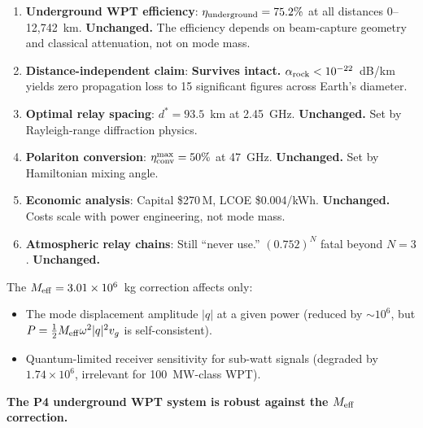 \documentclass[11pt]{article}
\newcommand{\ee}[1]{\times 10^{#1}}
\newcommand{\Meff}{M_{\rm eff}}
\newcommand{\alpharock}{\alpha_{\rm rock}}
\begin{document}
\begin{tcolorbox}[colback=green!5!white, colframe=green!60!black,
  title=\textbf{W3i5 P4 Verdict: All Core Claims Survive the $\Meff$ Correction}]
\begin{enumerate}[nosep]
\item \textbf{Underground WPT efficiency}: $\eta_{\rm underground} = 75.2\%$ at
  all distances 0--12,742~km. \textbf{Unchanged.} The efficiency depends on
  beam-capture geometry and classical attenuation, not on mode mass.
\item \textbf{Distance-independent claim}: \textbf{Survives intact.} $\alpharock
  < 10^{-22}$~dB/km yields zero propagation loss to 15 significant figures
  across Earth's diameter.
\item \textbf{Optimal relay spacing}: $d^* = 93.5$~km at 2.45~GHz.
  \textbf{Unchanged.} Set by Rayleigh-range diffraction physics.
\item \textbf{Polariton conversion}: $\eta_{\rm conv}^{\rm max} = 50\%$ at 47~GHz.
  \textbf{Unchanged.} Set by Hamiltonian mixing angle.
\item \textbf{Economic analysis}: Capital \$270\,M, LCOE \$0.004/kWh.
  \textbf{Unchanged.} Costs scale with power engineering, not mode mass.
\item \textbf{Atmospheric relay chains}: Still ``never use.'' $(0.752)^N$ fatal
  beyond $N=3$. \textbf{Unchanged.}
\end{enumerate}

The $\Meff = 3.01\ee{6}$~kg correction affects only:
\begin{itemize}[nosep]
\item The mode displacement amplitude $|q|$ at a given power (reduced by
  $\sim 10^6$, but $P = \frac{1}{2}\Meff\omega^2|q|^2 v_g$ is self-consistent).
\item Quantum-limited receiver sensitivity for sub-watt signals (degraded by
  $1.74\ee{6}$, irrelevant for 100~MW-class WPT).
\end{itemize}

\textbf{The P4 underground WPT system is robust against the $\Meff$ correction.}
\end{tcolorbox}
\end{document}
